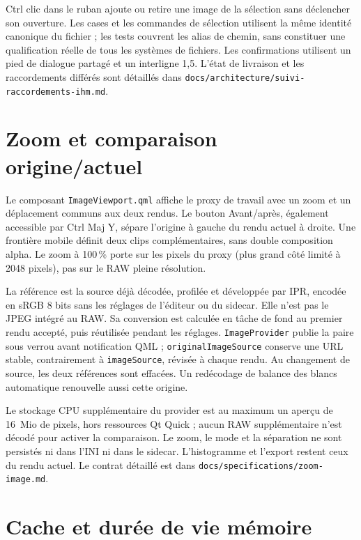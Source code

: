 Ctrl clic dans le ruban ajoute ou retire une image de la sélection sans
déclencher son ouverture. Les cases et les commandes de sélection utilisent
la même identité canonique du fichier ; les tests couvrent les alias de chemin,
sans constituer une qualification réelle de tous les systèmes de fichiers.
Les confirmations utilisent un pied de dialogue partagé et un interligne 1,5.
L'état de livraison et les raccordements différés sont détaillés dans
\texttt{docs/architecture/suivi-raccordements-ihm.md}.

\section{Zoom et comparaison origine/actuel}

Le composant \texttt{ImageViewport.qml} affiche le proxy de travail avec un
zoom et un déplacement communs aux deux rendus. Le bouton Avant/après,
également accessible par Ctrl Maj Y, sépare l'origine à gauche du rendu
actuel à droite. Une frontière mobile définit deux clips complémentaires,
sans double composition alpha. Le zoom à 100\,\% porte sur les pixels du
proxy (plus grand côté limité à 2048 pixels), pas sur le RAW pleine résolution.

La référence est la source déjà décodée, profilée et développée par IPR,
encodée en sRGB 8 bits sans les réglages de l'éditeur ou du sidecar. Elle
n'est pas le JPEG intégré au RAW. Sa conversion est calculée en tâche de
fond au premier rendu accepté, puis réutilisée pendant les réglages.
\texttt{ImageProvider} publie la paire sous verrou avant notification QML ;
\texttt{originalImageSource} conserve une URL stable, contrairement à
\texttt{imageSource}, révisée à chaque rendu. Au changement de source,
les deux références sont effacées. Un redécodage de balance des blancs
automatique renouvelle aussi cette origine.

Le stockage CPU supplémentaire du provider est au maximum un aperçu de
16~Mio de pixels, hors ressources Qt Quick ; aucun RAW supplémentaire n'est
décodé pour activer la comparaison. Le zoom, le mode et la séparation ne
sont persistés ni dans l'INI ni dans le sidecar. L'histogramme et l'export
restent ceux du rendu actuel. Le contrat détaillé est dans
\texttt{docs/specifications/zoom-image.md}.

\section{Cache et durée de vie mémoire}

